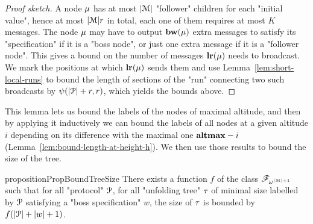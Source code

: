 \begin{proof}[Proof sketch]
	A node $\mu$ has at most $|\mathcal{M}|$ "follower" children for each "initial value", hence at most $|\mathcal{M}|r$ in total, each one of them requires at most $K$ messages. The node $\mu$ may have to output $\mathbf{bw}(\mu)$ extra messages to satisfy its "specification" if it is a "boss node", or just one extra message if it is a "follower node".
	This gives a bound on the number of messages $\mathbf{lr}(\mu)$ needs to broadcast. We mark the positions at which $\mathbf{lr}(\mu)$ sends them and use Lemma~\ref{lem:short-local-runs} to bound the length of sections of the "run" connecting two such broadcasts by $\psi(|\mathcal{P}|+r,r)$, which yields the bounds above.
\end{proof}

This lemma lets us bound the labels of the nodes of maximal altitude, and then by applying it inductively we can bound the labels of all nodes at a given altitude $i$ depending on its difference with the maximal one $\mathbf{altmax}-i$ (Lemma~\ref{lem:bound-length-at-height-h}). We then use those results to bound the size of the tree.

 
\begin{restatable}{proposition}{PropBoundTreeSize}
	\label{prop:bound-tree-size}
	There exists a function $f$ of the class $\mathscr{F}_{\omega^{|\mathcal{M}|+1}}$ such that for all "protocol" $\mathcal{P}$, for all "unfolding tree" $\tau$ of minimal size labelled by $\mathcal{P}$ satisfying a "boss specification" $w$, the size of $\tau$ is bounded by $f(|\mathcal{P}| + |w|+1)$.
\end{restatable}

